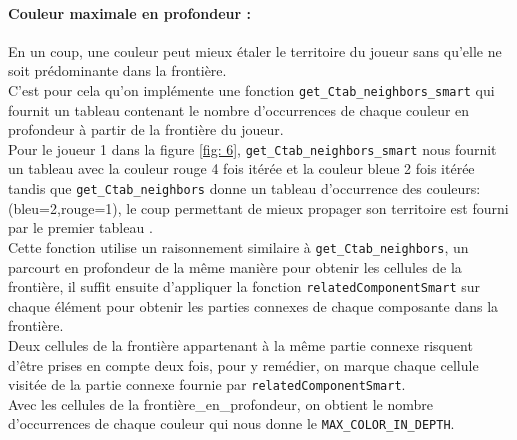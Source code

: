 \documentclass[11pt]{article}
\begin{document}
\paragraph{Couleur maximale en profondeur :\\}
En un coup, une couleur peut mieux étaler le territoire du joueur sans qu'elle ne soit prédominante dans la frontière.\\
C'est pour cela qu'on implémente une fonction \texttt{get\_Ctab\_neighbors\_smart} qui fournit un tableau contenant le nombre d'occurrences de chaque couleur en profondeur à partir de la frontière du joueur.\\
Pour le joueur 1 dans la figure \ref{fig: 6}, \texttt{get\_Ctab\_neighbors\_smart} nous fournit un tableau avec la couleur rouge 4 fois itérée et la couleur bleue 2 fois itérée tandis que \texttt{get\_Ctab\_neighbors} donne un tableau d'occurrence des couleurs: (bleu=2,rouge=1), le coup permettant de mieux propager son territoire est fourni par le premier tableau .\\


Cette fonction utilise un raisonnement similaire à \texttt{get\_Ctab\_neighbors}, un parcourt en profondeur de la même manière pour obtenir les cellules de la frontière, il suffit ensuite d'appliquer la fonction \texttt{relatedComponentSmart} sur chaque élément pour obtenir les parties connexes de chaque composante dans la frontière. \\Deux cellules de la frontière appartenant à la même partie connexe risquent d'être prises en compte deux fois, pour y remédier, on marque chaque cellule visitée de la partie connexe fournie par \texttt{relatedComponentSmart}. \\Avec les cellules de la frontière\_en\_profondeur, on obtient le nombre d'occurrences de chaque couleur qui nous donne le \texttt{MAX\_COLOR\_IN\_DEPTH}. \\
\end{document}
